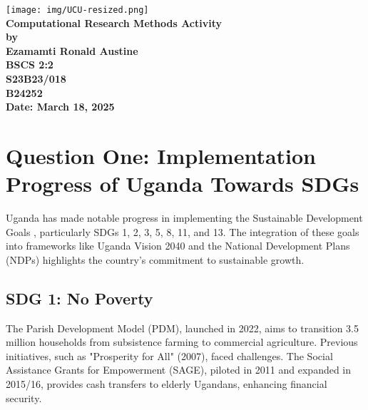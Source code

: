\documentclass[11pt]{article}
\begin{document}
\begin{titlepage}
    \begin{center}
    \vspace{2.5cm}  
        \texttt{[image: img/UCU-resized.png]} \\[2cm] %
        
        {\LARGE \textbf{Computational Research Methods Activity}} \\[1cm]

        {  \Large \textbf{by}} \\[1cm]
        
        \Large \textbf{Ezamamti Ronald Austine}  \\[0.5cm]
        
        \textbf{BSCS 2:2} \\[0.5cm]
        
        \textbf{S23B23/018} \\[0.5cm]
        
        \textbf{B24252} \\[1cm]

        \textbf{Date: March 18, 2025}
    \end{center}
\end{titlepage}

\newpage
\section*{Question One: Implementation Progress of Uganda Towards SDGs}
\onehalfspacing
{}
Uganda has made notable progress in implementing the Sustainable Development Goals \cite{sdg2023}, particularly SDGs 1, 2, 3, 5, 8, 11, and 13. The integration of these goals into frameworks like Uganda Vision 2040 and the National Development Plans (NDPs) highlights the country's commitment to sustainable growth.

\subsection*{SDG 1: No Poverty}
The Parish Development Model (PDM), launched in 2022, aims to transition 3.5 million households from subsistence farming to commercial agriculture. Previous initiatives, such as "Prosperity for All" (2007)\cite {ndpiv2025}, faced challenges. The Social Assistance Grants for Empowerment (SAGE), piloted in 2011 and expanded in 2015/16, provides cash transfers to elderly Ugandans, enhancing financial security.
\end{document}
